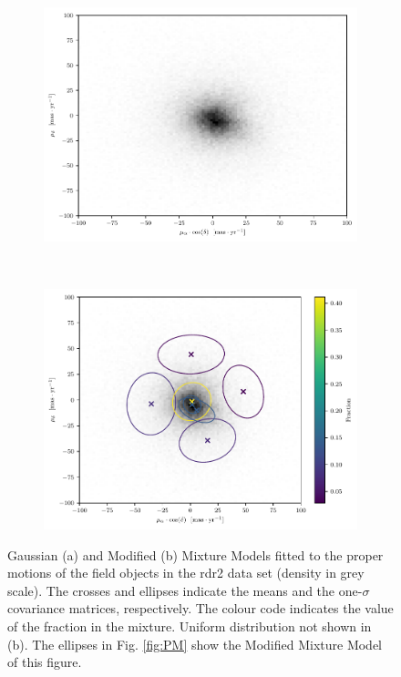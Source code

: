 \begin{figure}[ht!]
    \centering
    \begin{subfigure}[t]{0.8\textwidth}
        \includegraphics[page=3,width=\textwidth]{background/Figures/GMM-PM-BIC=15.pdf}
        \caption{}
        \label{fig:fpmGMM}
    \end{subfigure}
    \\
    \begin{subfigure}[t]{0.8\textwidth}
      \includegraphics[page=1,width=\textwidth]{background/Figures/Field_GMM.pdf}
        \caption{}
        \label{fig:fpmMMM} 
    \end{subfigure}
\caption{Gaussian (a) and Modified (b) Mixture Models fitted to the proper motions of the field objects in the \gls{rdr2} data set (density in grey scale). The crosses and ellipses indicate the means and the one-$\sigma$ covariance matrices, respectively. The colour code indicates the value of the fraction in the mixture. Uniform distribution not shown in (b). The ellipses in Fig. \ref{fig:PM} show the Modified Mixture Model of this figure.}
\label{fig:GMMvsMMM}
\end{figure}

